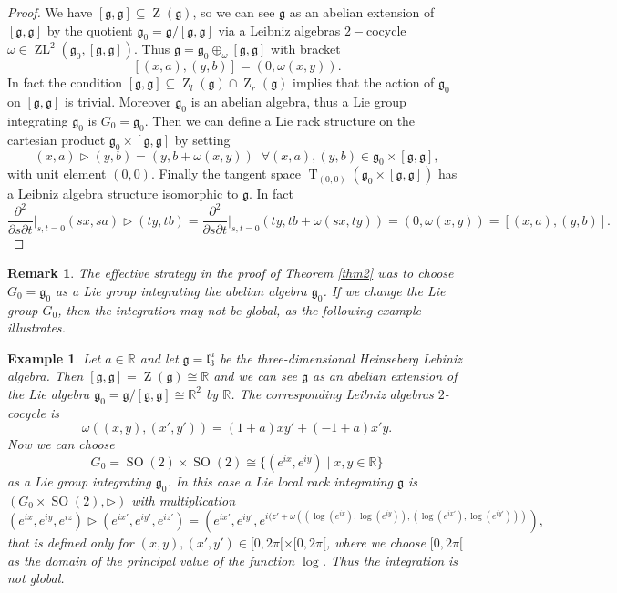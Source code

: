 \documentclass[english,4paper,10pt]{article}
\newcommand{\mg}{\mathfrak{g}}
\newtheorem{rem}[thm]{Remark}
\newtheorem{ex}[thm]{Example}
\begin{document}
\begin{proof}
We have $\left[\mg,\mg\right]\subseteq \operatorname{Z}(\mg)$, so we can see $\mg$ as an abelian extension of $\left[\mg,\mg\right]$ by the quotient $\mg_0=\mg/\left[\mg,\mg\right]$ via a Leibniz algebras $2-$cocycle $\omega\in \operatorname{ZL}^2(\mg_0,\left[\mg,\mg\right])$. Thus $\mg=\mg_0\oplus_\omega \left[\mg,\mg\right]$ with bracket 
$$
\left[\left(x,a\right),\left(y,b\right)\right]=\left(0,\omega(x,y)\right).
$$ 
In fact the condition $\left[\mg,\mg\right]\subseteq \operatorname{Z}_l(\mg) \cap \operatorname{Z}_r(\mg)$ implies that the action of $\mg_0$ on $\left[\mg,\mg\right]$ is trivial.
Moreover $\mg_0$ is an abelian algebra, thus a Lie group integrating $\mg_0$ is $G_0=\mg_0$. Then we can define a Lie rack structure on the cartesian product $\mg_0\times\left[\mg,\mg\right]$ by setting 
$$
\left(x,a\right)\rhd\left(y,b\right)=\left(y,b+\omega(x,y)\right)\;\;\forall \left(x,a\right),\left(y,b\right)\in \mg_0\times\left[\mg,\mg\right],
$$
with unit element $\left(0,0\right)$. Finally the tangent space $\operatorname{T}_{\left(0,0\right)}\left(\mg_0\times\left[\mg,\mg\right]\right)$ has a Leibniz algebra structure isomorphic to $\mg$. In fact
\begin{equation*}
\frac{\partial^2}{\partial s\partial t}\bigg|_{s,t=0}(sx,sa)\rhd (ty,tb)=\frac{\partial^2}{\partial s\partial t}\bigg|_{s,t=0}\left(ty,tb+\omega\left(sx,ty\right)\right)=\left(0,\omega\left(x,y\right)\right)=\left[\left(x,a\right),\left(y,b\right)\right].
\end{equation*}
\end{proof}

\begin{rem}
The effective strategy in the proof of \textit{Theorem} \ref{thm2} was to choose $G_0=\mg_0$ as a Lie group integrating the abelian algebra $\mg_0$. If we change the Lie group $G_0$, then the integration may not be global, as the following example illustrates.
\end{rem}

\begin{ex}
	Let $a \in \mathbb{R}$ and let $\mg=\mathfrak{l}_3^a$ be the three-dimensional Heinseberg Lebiniz algebra. Then $[\mg,\mg]=\operatorname{Z}(\mg)\cong\mathbb{R}$ and we can see $\mg$ as an abelian extension of the Lie algebra $\mg_0=\mg / [\mg,\mg] \cong \mathbb{R}^2$ by $\mathbb{R}$. The corresponding Leibniz algebras $2$-cocycle is
	$$
	\omega((x,y),(x',y'))=(1+a)xy'+(-1+a)x'y.
	$$	
	Now we can choose 
	$$
	G_0=\operatorname{SO}(2) \times \operatorname{SO}(2) \cong \lbrace (e^{ix},e^{iy}) \; \vert \; x,y \in \mathbb{R}\rbrace
	$$
	as a Lie group integrating $\mg_0$. In this case a Lie local rack integrating $\mg$ is $(G_0 \times \operatorname{SO}(2),\rhd)$ with multiplication
	$$
	(e^{ix},e^{iy},e^{iz}) \rhd (e^{ix'},e^{iy'},e^{iz'})=(e^{ix'},e^{iy'},e^{i(z'+\omega((\operatorname{log}(e^{ix}),\operatorname{log}(e^{iy})),(\operatorname{log}(e^{ix'}),\operatorname{log}(e^{iy'})))}),
	$$
	that is defined only for $(x,y),(x',y') \in [0,2\pi[ \times [0,2\pi[$, where we choose $[0,2\pi[$ as the domain of the principal value of the function $\operatorname{log}$. Thus the integration is not global.
\end{ex}
\end{document}
